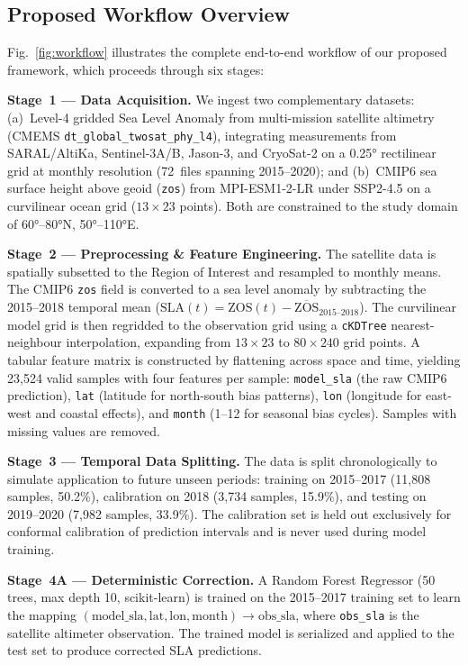 \documentclass[conference]{IEEEtran}
\begin{document}
\subsection{Proposed Workflow Overview}

Fig.~\ref{fig:workflow} illustrates the complete end-to-end workflow of our proposed framework, which proceeds through six stages:

\textbf{Stage~1 --- Data Acquisition.} We ingest two complementary datasets: (a)~Level-4 gridded Sea Level Anomaly from multi-mission satellite altimetry (CMEMS \texttt{dt\_global\_twosat\_phy\_l4}), integrating measurements from SARAL/AltiKa, Sentinel-3A/B, Jason-3, and CryoSat-2 on a 0.25° rectilinear grid at monthly resolution (72~files spanning 2015--2020); and (b)~CMIP6 sea surface height above geoid (\texttt{zos}) from MPI-ESM1-2-LR under SSP2-4.5 on a curvilinear ocean grid ($13 \times 23$ points). Both are constrained to the study domain of 60°--80°N, 50°--110°E.

\textbf{Stage~2 --- Preprocessing \& Feature Engineering.} The satellite data is spatially subsetted to the Region of Interest and resampled to monthly means. The CMIP6 \texttt{zos} field is converted to a sea level anomaly by subtracting the 2015--2018 temporal mean ($\text{SLA}(t) = \text{ZOS}(t) - \overline{\text{ZOS}}_{2015\text{--}2018}$). The curvilinear model grid is then regridded to the observation grid using a \texttt{cKDTree} nearest-neighbour interpolation, expanding from $13 \times 23$ to $80 \times 240$ grid points. A tabular feature matrix is constructed by flattening across space and time, yielding 23,524 valid samples with four features per sample: \texttt{model\_sla} (the raw CMIP6 prediction), \texttt{lat} (latitude for north-south bias patterns), \texttt{lon} (longitude for east-west and coastal effects), and \texttt{month} (1--12 for seasonal bias cycles). Samples with missing values are removed.

\textbf{Stage~3 --- Temporal Data Splitting.} The data is split chronologically to simulate application to future unseen periods: training on 2015--2017 (11,808 samples, 50.2\%), calibration on 2018 (3,734 samples, 15.9\%), and testing on 2019--2020 (7,982 samples, 33.9\%). The calibration set is held out exclusively for conformal calibration of prediction intervals and is never used during model training.

\textbf{Stage~4A --- Deterministic Correction.} A Random Forest Regressor (50 trees, max depth 10, scikit-learn) is trained on the 2015--2017 training set to learn the mapping $(\text{model\_sla}, \text{lat}, \text{lon}, \text{month}) \rightarrow \text{obs\_sla}$, where \texttt{obs\_sla} is the satellite altimeter observation. The trained model is serialized and applied to the test set to produce corrected SLA predictions.
\end{document}
